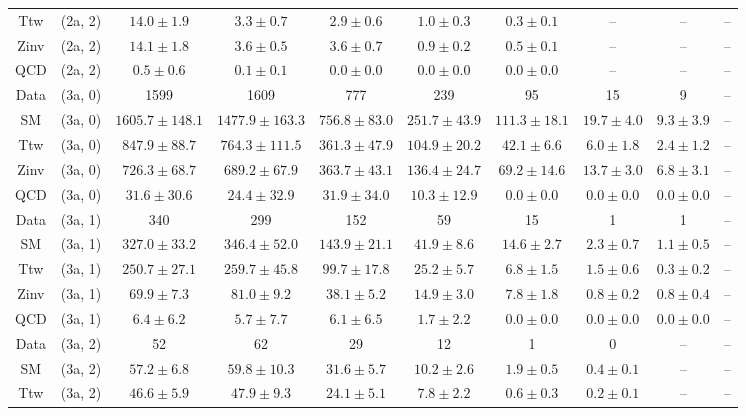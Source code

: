 \begin{table}[h!]
{\begin{tabular}{cccccccccc}
	Ttw & (2a, 2) & $14.0\pm 1.9$ & $3.3\pm 0.7$ & $2.9\pm 0.6$ & $1.0\pm 0.3$ & $0.3\pm 0.1$ & -- & -- & -- \\[0.5ex] 
	Zinv & (2a, 2) & $14.1\pm 1.8$ & $3.6\pm 0.5$ & $3.6\pm 0.7$ & $0.9\pm 0.2$ & $0.5\pm 0.1$ & -- & -- & -- \\[0.5ex] 
	QCD & (2a, 2) & $0.5\pm 0.6$ & $0.1\pm 0.1$ & $0.0\pm 0.0$ & $0.0\pm 0.0$ & $0.0\pm 0.0$ & -- & -- & -- \\[0.5ex] 
	Data & (3a, 0) & 1599 & 1609 & 777 & 239 & 95 & 15 & 9 & -- \\[0.5ex] 
	SM & (3a, 0) & $1605.7\pm 148.1$ & $1477.9\pm 163.3$ & $756.8\pm 83.0$ & $251.7\pm 43.9$ & $111.3\pm 18.1$ & $19.7\pm 4.0$ & $9.3\pm 3.9$ & -- \\[0.5ex] 
	Ttw & (3a, 0) & $847.9\pm 88.7$ & $764.3\pm 111.5$ & $361.3\pm 47.9$ & $104.9\pm 20.2$ & $42.1\pm 6.6$ & $6.0\pm 1.8$ & $2.4\pm 1.2$ & -- \\[0.5ex] 
	Zinv & (3a, 0) & $726.3\pm 68.7$ & $689.2\pm 67.9$ & $363.7\pm 43.1$ & $136.4\pm 24.7$ & $69.2\pm 14.6$ & $13.7\pm 3.0$ & $6.8\pm 3.1$ & -- \\[0.5ex] 
	QCD & (3a, 0) & $31.6\pm 30.6$ & $24.4\pm 32.9$ & $31.9\pm 34.0$ & $10.3\pm 12.9$ & $0.0\pm 0.0$ & $0.0\pm 0.0$ & $0.0\pm 0.0$ & -- \\[0.5ex] 
	Data & (3a, 1) & 340 & 299 & 152 & 59 & 15 & 1 & 1 & -- \\[0.5ex] 
	SM & (3a, 1) & $327.0\pm 33.2$ & $346.4\pm 52.0$ & $143.9\pm 21.1$ & $41.9\pm 8.6$ & $14.6\pm 2.7$ & $2.3\pm 0.7$ & $1.1\pm 0.5$ & -- \\[0.5ex] 
	Ttw & (3a, 1) & $250.7\pm 27.1$ & $259.7\pm 45.8$ & $99.7\pm 17.8$ & $25.2\pm 5.7$ & $6.8\pm 1.5$ & $1.5\pm 0.6$ & $0.3\pm 0.2$ & -- \\[0.5ex] 
	Zinv & (3a, 1) & $69.9\pm 7.3$ & $81.0\pm 9.2$ & $38.1\pm 5.2$ & $14.9\pm 3.0$ & $7.8\pm 1.8$ & $0.8\pm 0.2$ & $0.8\pm 0.4$ & -- \\[0.5ex] 
	QCD & (3a, 1) & $6.4\pm 6.2$ & $5.7\pm 7.7$ & $6.1\pm 6.5$ & $1.7\pm 2.2$ & $0.0\pm 0.0$ & $0.0\pm 0.0$ & $0.0\pm 0.0$ & -- \\[0.5ex] 
	Data & (3a, 2) & 52 & 62 & 29 & 12 & 1 & 0 & -- & -- \\[0.5ex] 
	SM & (3a, 2) & $57.2\pm 6.8$ & $59.8\pm 10.3$ & $31.6\pm 5.7$ & $10.2\pm 2.6$ & $1.9\pm 0.5$ & $0.4\pm 0.1$ & -- & -- \\[0.5ex] 
	Ttw & (3a, 2) & $46.6\pm 5.9$ & $47.9\pm 9.3$ & $24.1\pm 5.1$ & $7.8\pm 2.2$ & $0.6\pm 0.3$ & $0.2\pm 0.1$ & -- & -- \\[0.5ex] 

\end{tabular}}
\end{table}
